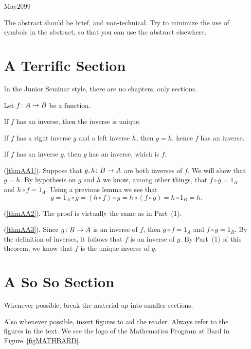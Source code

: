 \documentclass[11pt, twoside, reqno]{article}
\begin{document}
    {May}{2099}

\abstr

The abstract should be brief, and non-technical.  Try to minimize the use of symbols in the abstract, so that you can use the abstract elsewhere.

\tableofcontents

\startmain

\section{A Terrific Section}
\label{secA1}

In the Junior Seminar style, there are no chapters, only sections.

\thm\label{thmAA} 
Let ${f} \colon {A} \to {B}$ be a function.
%
\enum 
\item\label{thmAA1}
If $f$ has an inverse, then the inverse is unique.
%
\item\label{thmAA2}
If $f$ has a right inverse $g$ and a left inverse $h$, then $g = h$; hence $f$ has an inverse.
%
\item\label{thmAA3}
If $f$ has an inverse $g$, then $g$ has an inverse, which is $f$.
\eenum
\ethm
 
\demo
(\ref{thmAA1}). Suppose that ${g, h} \colon {B} \to {A}$ are both inverses of $f$.  We will show that $g = h$.  By hypothesis on $g$ and $h$ we know, among other things, that $f \circ g = 1_B$ and $h \circ f = 1_A$.  Using a previous lemma we see that
%
\[
g  =  1_A \circ g  =  (h \circ f) \circ g  =  h \circ (f \circ g)  =  h \circ 1_B  =  h.
\]

\noindent (\ref{thmAA2}). The proof is virtually the same as in Part~(1).  
\smallskip

\noindent (\ref{thmAA3}).  Since ${g} \colon {B} \to {A}$ is an inverse of $f$, then $g \circ f = 1_A$ and $f \circ g = 1_B$.  By the definition of inverses, it follows that $f$ is an inverse of $g$.  By Part~(1) of this theorem, we know that $f$ is the unique inverse of $g$.
\edemo


\section{A So So Section}
\label{secAB}

Whenever possible, break the material up into smaller sections.

Also whenever possible, insert figures to aid the reader.  Always refer to the figures in the text.  We see the logo of the Mathematics Program at Bard in Figure~\ref{figMATHBARD}.
\end{document}
